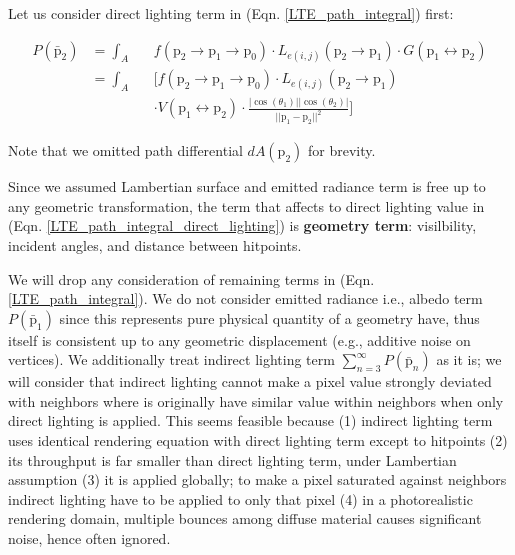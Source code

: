 Let us consider direct lighting term in (Eqn. \ref{LTE_path_integral}) first:

\begin{align}
    \mathit{P}\left(\bar{\mathrm{p}}_2\right) & = \int_A && f\left(\mathrm{p}_2\rightarrow \mathrm{p}_1 \rightarrow \mathrm{p}_0\right)\cdot L_{e(i,j)}\left(\mathrm{p}_2\rightarrow \mathrm{p}_1\right) \cdot G\left(\mathrm{p}_1 \leftrightarrow \mathrm{p}_2\right) \nonumber \\
    & = \int_A && \Bigg[ f\left(\mathrm{p}_2\rightarrow \mathrm{p}_1 \rightarrow \mathrm{p}_0\right)\cdot L_{e(i,j)}(\mathrm{p}_2\rightarrow \mathrm{p}_1) \nonumber \\ 
    & && \cdot V(\mathrm{p}_1 \leftrightarrow \mathrm{p}_2) \cdot \frac{|\cos(\theta_1)| |\cos(\theta_2)|}{||\mathrm{p}_1-\mathrm{p}_2||^2}\Bigg]
    \label{LTE_path_integral_direct_lighting}
\end{align}

Note that we omitted path differential $dA(\mathrm{p}_2)$ for brevity.

Since we assumed Lambertian surface and emitted radiance term is free up to any geometric transformation, the term that affects to direct lighting value in (Eqn. \ref{LTE_path_integral_direct_lighting}) is \textbf{geometry term}: visilbility, incident angles, and distance between hitpoints. 

We will drop any consideration of remaining terms in (Eqn. \ref{LTE_path_integral}). We do not consider emitted radiance i.e., albedo term $\mathit{P}\left(\bar{\mathrm{p}}_1\right)$ since this represents pure physical quantity of a geometry have, thus itself is consistent up to any geometric displacement (e.g., additive noise on vertices).
We additionally treat indirect lighting term $\sum_{n=3}^\infty \mathit{P}(\bar{\mathrm{p}}_n)$ as it is; we will consider that indirect lighting cannot make a pixel value strongly deviated with neighbors where is originally have similar value within neighbors when only direct lighting is applied. 
This seems feasible because (1) indirect lighting term uses identical rendering equation with direct lighting term except to hitpoints (2) its throughput is far smaller than direct lighting term, under Lambertian assumption (3) it is applied globally; to make a pixel saturated against neighbors indirect lighting have to be applied to only that pixel (4) in a photorealistic rendering domain, multiple bounces among diffuse material causes significant noise, hence often ignored\cite{moon2013robust}.

